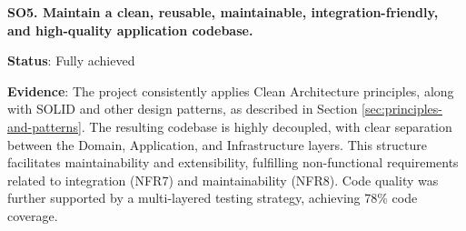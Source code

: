 \textbf{SO5. Maintain a clean, reusable, maintainable, integration-friendly, and high-quality application codebase.}

\textbf{Status}: Fully achieved

\textbf{Evidence}: The project consistently applies Clean Architecture principles, along with SOLID and other design patterns, as described in Section \ref{sec:principles-and-patterns}. The resulting codebase is highly decoupled, with clear separation between the Domain, Application, and Infrastructure layers. This structure facilitates maintainability and extensibility, fulfilling non-functional requirements related to integration (NFR7) and maintainability (NFR8). Code quality was further supported by a multi-layered testing strategy, achieving 78\% code coverage.
